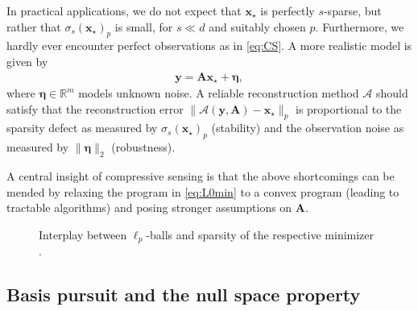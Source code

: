 \documentclass{svproc}
\newcommand{\bA}{\boldsymbol{A}}
\newcommand{\bx}{\boldsymbol{x}}
\newcommand{\by}{\boldsymbol{y}}
\newcommand{\bz}{\boldsymbol{z}}
\newcommand{\Eta}{\boldsymbol{\eta}}
\newcommand{\0}{\boldsymbol{0}}
\newcommand{\1}{\boldsymbol{1}}
\newcommand{\calA}{\mathcal{A}}
\def\calA{\mathcal{A}}
\def\R{\mathbb{R}}
\begin{document}
In practical applications, we do not expect that $\bx_\star$ is perfectly $s$-sparse, but rather that $\sigma_s(\bx_\star)_p$ is small, for $s \ll d$ and suitably chosen $p$. Furthermore, we hardly ever encounter perfect observations as in \eqref{eq:CS}. A more realistic model is given by
\begin{align}
    \label{eq:CSnoise}
    \by = \bA\bx_\star + \Eta,
\end{align}
where $\Eta \in \R^m$ models unknown noise. A reliable reconstruction method $\calA$ should satisfy that the reconstruction error $\| \calA(\by,\bA) - \bx_\star \|_p$ is proportional to the sparsity defect as measured by $\sigma_s(\bx_\star)_p$ (stability) and the observation noise as measured by $\| \Eta \|_2$ (robustness). 

A central insight of compressive sensing is that the above shortcomings can be mended by relaxing the program in \eqref{eq:L0min} to a convex program (leading to tractable algorithms) and posing stronger assumptions on $\bA$.


\begin{figure}[!t]
    	\centering
    	\caption{Interplay between $\ell_p$-balls and sparsity of the respective minimizer \cite{maly2019recovery}.}
    	\label{fig:BP}
\end{figure}

\subsection{Basis pursuit and the null space property}
\end{document}
